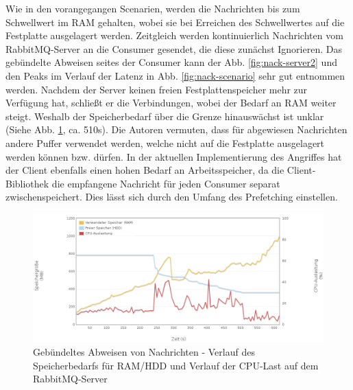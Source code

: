 \documentclass[	a4paper,
			11pt,
			oneside,
			parskip]{scrartcl}
\begin{document}
	
	\clearpage
		{%
		  \newline
		  \newline
		  \newline
		}{%
		 Wie in den vorangegangen Scenarien, werden die Nachrichten bis zum Schwellwert im RAM gehalten, wobei sie bei Erreichen des Schwellwertes auf die Festplatte ausgelagert werden.
		 Zeitgleich werden kontinuierlich Nachrichten vom RabbitMQ-Server an die Consumer gesendet, die diese zunächst Ignorieren. Das gebündelte Abweisen seites der Consumer kann der Abb.
		 \ref{fig:nack-server2} und den Peaks im Verlauf der Latenz in Abb. \ref{fig:nack-scenario} sehr gut entnommen werden. Nachdem der Server keinen freien Festplattenspeicher mehr zur 
		 Verfügung hat, schließt er die Verbindungen, wobei der Bedarf an RAM weiter steigt. Weshalb der Speicherbedarf über die Grenze hinauswächst ist unklar (Siehe Abb. \ref{fig:nack-server1}, ca. 510s).
		 Die Autoren vermuten, dass für abgewiesen Nachrichten andere Puffer verwendet werden, welche nicht auf die Festplatte ausgelagert werden können bzw. dürfen.
		}{
		 In der aktuellen Implementierung des Angriffes hat der Client ebenfalls einen hohen Bedarf an Arbeitsspeicher, da die Client-Bibliothek die empfangene Nachricht für jeden Consumer
		 separat zwischenspeichert. Dies lässt sich durch den Umfang des Prefetching einstellen.
		}
		
		\begin{figure}[!htb]
			\centering
			\includegraphics[width=\textwidth]{img/nack/nack_server1.png}
			\caption{Gebündeltes Abweisen von Nachrichten - Verlauf des Speicherbedarfs für RAM/HDD und Verlauf der CPU-Last auf dem RabbitMQ-Server}
			\label{fig:nack-server1}
		\end{figure}
		
\end{document}
